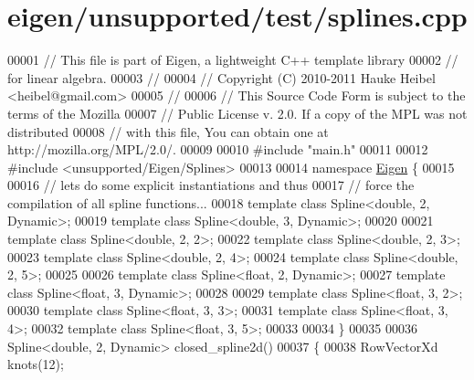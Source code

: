 \hypertarget{eigen_2unsupported_2test_2splines_8cpp_source}{}\section{eigen/unsupported/test/splines.cpp}
\label{eigen_2unsupported_2test_2splines_8cpp_source}

\begin{DoxyCode}
00001 \textcolor{comment}{// This file is part of Eigen, a lightweight C++ template library}
00002 \textcolor{comment}{// for linear algebra.}
00003 \textcolor{comment}{//}
00004 \textcolor{comment}{// Copyright (C) 2010-2011 Hauke Heibel <heibel@gmail.com>}
00005 \textcolor{comment}{//}
00006 \textcolor{comment}{// This Source Code Form is subject to the terms of the Mozilla}
00007 \textcolor{comment}{// Public License v. 2.0. If a copy of the MPL was not distributed}
00008 \textcolor{comment}{// with this file, You can obtain one at http://mozilla.org/MPL/2.0/.}
00009 
00010 \textcolor{preprocessor}{#include "main.h"}
00011 
00012 \textcolor{preprocessor}{#include <unsupported/Eigen/Splines>}
00013 
00014 \textcolor{keyword}{namespace }\hyperlink{namespace_eigen}{Eigen} \{
00015   
00016   \textcolor{comment}{// lets do some explicit instantiations and thus}
00017   \textcolor{comment}{// force the compilation of all spline functions...}
00018   \textcolor{keyword}{template} \textcolor{keyword}{class }Spline<double, 2, Dynamic>;
00019   \textcolor{keyword}{template} \textcolor{keyword}{class }Spline<double, 3, Dynamic>;
00020 
00021   \textcolor{keyword}{template} \textcolor{keyword}{class }Spline<double, 2, 2>;
00022   \textcolor{keyword}{template} \textcolor{keyword}{class }Spline<double, 2, 3>;
00023   \textcolor{keyword}{template} \textcolor{keyword}{class }Spline<double, 2, 4>;
00024   \textcolor{keyword}{template} \textcolor{keyword}{class }Spline<double, 2, 5>;
00025 
00026   \textcolor{keyword}{template} \textcolor{keyword}{class }Spline<float, 2, Dynamic>;
00027   \textcolor{keyword}{template} \textcolor{keyword}{class }Spline<float, 3, Dynamic>;
00028 
00029   \textcolor{keyword}{template} \textcolor{keyword}{class }Spline<float, 3, 2>;
00030   \textcolor{keyword}{template} \textcolor{keyword}{class }Spline<float, 3, 3>;
00031   \textcolor{keyword}{template} \textcolor{keyword}{class }Spline<float, 3, 4>;
00032   \textcolor{keyword}{template} \textcolor{keyword}{class }Spline<float, 3, 5>;
00033 
00034 \}
00035 
00036 Spline<double, 2, Dynamic> closed\_spline2d()
00037 \{
00038   RowVectorXd knots(12);

\end{DoxyCode}
